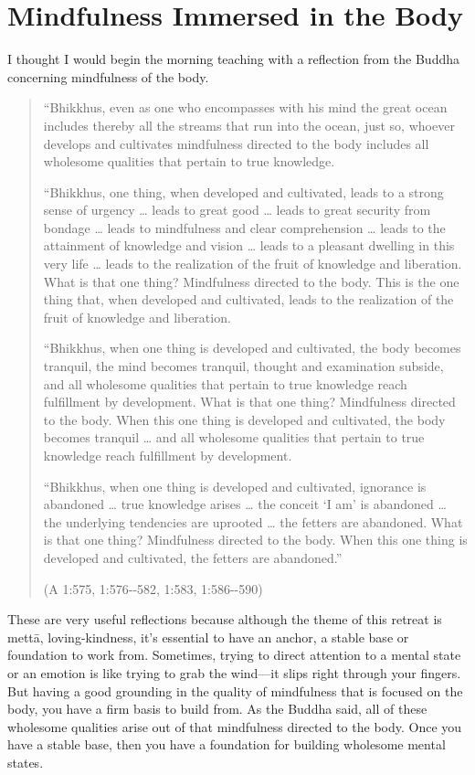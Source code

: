 \chapter{Mindfulness Immersed in the
Body}

I thought I would begin the morning teaching with a reflection from the
Buddha concerning mindfulness of the body.

\begin{quotation}
“Bhikkhus, even as one who encompasses with his mind the great ocean
includes thereby all the streams that run into the ocean, just so,
whoever develops and cultivates mindfulness directed to the body
includes all wholesome qualities that pertain to true knowledge.

“Bhikkhus, one thing, when developed and cultivated, leads to a strong
sense of urgency \ldots{} leads to great good \ldots{} leads to great security
from bondage \ldots{} leads to mindfulness and clear comprehension \ldots{} leads
to the attainment of knowledge and vision \ldots{} leads to a pleasant
dwelling in this very life \ldots{} leads to the realization of the fruit of
knowledge and liberation. What is that one thing? Mindfulness directed
to the body. This is the one thing that, when developed and cultivated,
leads to the realization of the fruit of knowledge and liberation.

“Bhikkhus, when one thing is developed and cultivated, the body becomes
tranquil, the mind becomes tranquil, thought and examination subside,
and all wholesome qualities that pertain to true knowledge reach
fulfillment by development. What is that one thing? Mindfulness directed
to the body. When this one thing is developed and cultivated, the body
becomes tranquil \ldots{} and all wholesome qualities that pertain to true
knowledge reach fulfillment by development.

“Bhikkhus, when one thing is developed and cultivated, ignorance is
abandoned \ldots{} true knowledge arises \ldots{} the conceit ‘I am’ is abandoned
\ldots{} the underlying tendencies are uprooted \ldots{} the fetters are
abandoned. What is that one thing? Mindfulness directed to the body.
When this one thing is developed and cultivated, the fetters are
abandoned.”

(A 1:575, 1:576-\/-582, 1:583, 1:586-\/-590)
\end{quotation}

These are very useful reflections because although the theme of this
retreat is mettā, loving-kindness, it’s essential to have an anchor, a
stable base or foundation to work from. Sometimes, trying to direct
attention to a mental state or an emotion is like trying to grab the
wind—it slips right through your fingers. But having a good grounding in
the quality of mindfulness that is focused on the body, you have a firm
basis to build from. As the Buddha said, all of these wholesome
qualities arise out of that mindfulness directed to the body. Once you
have a stable base, then you have a foundation for building wholesome
mental states.

